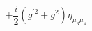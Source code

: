 %
\begin{dmath*}
%
  +  \frac{i}{2}\left({\bar g}^{\prime 2} + {\bar g}{}^2\right) \eta_{\mu_3 \mu_4}
%
\end{dmath*}
%
